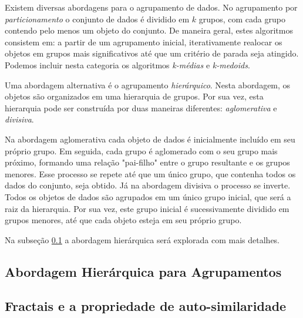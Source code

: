 Existem diversas abordagens para o agrupamento de dados. No agrupamento por
\emph{particionamento} o conjunto de dados é dividido em $k$ grupos, com cada 
grupo contendo pelo menos um objeto do conjunto. De maneira geral, estes
algoritmos consistem em: a partir de um agrupamento inicial, iterativamente 
realocar os objetos em grupos mais significativos até que um critério de parada
seja atingido. Podemos incluir nesta categoria os algoritmos \emph{k-médias} e
\emph{k-medoids}.

Uma abordagem alternativa é o agrupamento \emph{hierárquico}. Nesta abordagem, 
os objetos são organizados em uma hierarquia de grupos. Por sua vez, esta
hierarquia pode ser construída por duas maneiras diferentes:
\emph{aglomerativa} e \emph{divisiva}.

Na abordagem aglomerativa cada objeto de dados é inicialmente incluído em seu
próprio grupo. Em seguida, cada grupo é aglomerado com o seu grupo mais próximo,
formando uma relação "pai-filho" entre o grupo resultante e os grupos menores.
Esse processo se repete até que um único grupo, que contenha todos os dados do 
conjunto, seja obtido. Já na abordagem divisiva o processo se inverte. Todos os
objetos de dados são agrupados em um único grupo inicial, que será a raiz da 
hierarquia. Por sua vez, este grupo inicial é sucessivamente dividido em grupos
menores, até que cada objeto esteja em seu próprio grupo.

Na subseção \ref{subsec:abordagem_hierarquica} a abordagem hierárquica será
explorada com mais detalhes.

\subsection{Abordagem Hierárquica para Agrupamentos}
	\label{subsec:abordagem_hierarquica}






\subsection{Fractais e a propriedade de auto-similaridade}
	\label{subsec:fractais}

